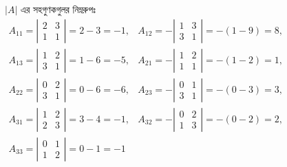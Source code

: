 $|A|$ এর সহগুণকগুলর নিম্নরুপঃ \\
$\begin{array}{cc}
A_{11}=\left|\begin{array}{cc}
2 & 3 \\
1 & 1
\end{array}\right|=2-3=-1, & A_{12}=-\left|\begin{array}{cc}
1 & 3 \\
3 & 1
\end{array}\right|=-(1-9)=8, \\
A_{13}=\left|\begin{array}{cc}
1 & 2 \\
3 & 1
\end{array}\right|=1-6=-5,  & A_{21}=-\left|\begin{array}{cc}
1 & 2 \\
1 & 1
\end{array}\right|=-(1-2)=1, \\
A_{22}=\left|\begin{array}{cc}
0 & 2 \\
3 & 1
\end{array}\right|=0-6=-6, & A_{23}=-\left|\begin{array}{cc}
0 & 1 \\
3 & 1
\end{array}\right|=-(0-3)=3, \\
A_{31}=\left|\begin{array}{cc}
1 & 2 \\
2 & 3
\end{array}\right|=3-4=-1, & A_{32}=-\left|\begin{array}{cc}
0 & 2 \\
1 & 3
\end{array}\right|=-(0-2)=2, \\
A_{33}=\left|\begin{array}{cc}
0 & 1 \\
1 & 2
\end{array}\right|=0-1=-1 &
\end{array}$\\ 

